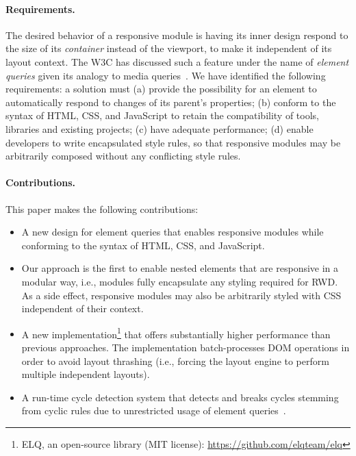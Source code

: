 \documentclass[lnbip]{svmultln}
\begin{document}
  \paragraph{Requirements.}\label{sec:reqs}
    The desired behavior of a responsive module is having its inner
    design respond to the size of its \emph{container} instead of the
    viewport, to make it independent of its layout context.  The W3C
    has discussed such a feature under the name of \emph{element
      queries} given its analogy to media queries~\cite{w3c_eq_mail}.
    We have identified the following requirements: a solution must (a)
    provide the possibility for an element to automatically respond to
    changes of its parent's properties; (b) conform to the syntax of
    HTML, CSS, and JavaScript to retain the compatibility of tools,
    libraries and existing projects; (c) have adequate performance;
    (d) enable developers to write encapsulated style rules, so that
    responsive modules may be arbitrarily composed without any
    conflicting style rules.

  \paragraph{Contributions.}
    This paper makes the following contributions:
    \begin{itemize}
      \item A new design for element queries that enables responsive modules while conforming to the syntax of HTML, CSS, and JavaScript.
      \item
        Our approach is the first to enable nested elements that are responsive in a modular way, i.e., modules fully encapsulate any styling required for RWD.
        As a side effect, responsive modules may also be arbitrarily styled with CSS independent of their context.
      \item
        A new implementation\footnote{ELQ, an open-source library (MIT license): \url{https://github.com/elqteam/elq}} that offers substantially higher performance than previous approaches.
        The implementation batch-processes DOM operations in order to avoid layout thrashing (i.e., forcing the layout engine to perform multiple independent layouts).
      \item
        A run-time cycle detection system that detects and breaks cycles stemming from cyclic rules due to unrestricted usage of element queries~\cite{elq-thesis}.
    \end{itemize}
\end{document}
